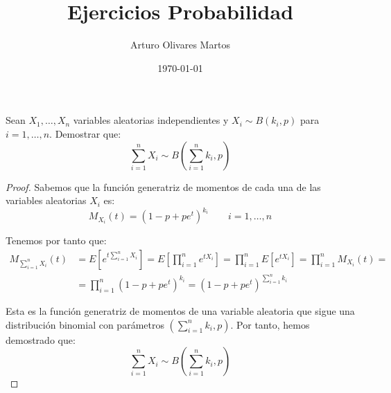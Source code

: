 \documentclass[12pt]{article}
\title{Ejercicios Probabilidad}
\date{\today}
\author{Arturo Olivares Martos}
\begin{document}
    \maketitle

    \begin{ejercicio}
        Sean $X_1, \dots, X_n$ variables aleatorias independientes y $X_i\sim B(k_i, p)$ para $i=1,\dots,n$. Demostrar que:
        \begin{equation*}
            \sum_{i=1}^{n}X_i \sim B\left(\sum_{i=1}^{n}k_i, p\right)
        \end{equation*}
    
        \begin{proof}
            Sabemos que la función generatriz de momentos de cada una de las variables aleatorias $X_i$ es:
            \begin{equation*}
                M_{X_i}(t) = (1-p+pe^t)^{k_i} \qquad i=1,\dots,n
            \end{equation*}
    
            Tenemos por tanto que:
            \begin{align*}
                M_{\sum\limits_{i=1}^{n}X_i}(t) &= E\left[e^{t\sum\limits_{i=1}^{n}X_i}\right] = E\left[\prod_{i=1}^{n}e^{tX_i}\right] = \prod_{i=1}^{n}E[e^{tX_i}] = \prod_{i=1}^{n}M_{X_i}(t) =\\
                &= \prod_{i=1}^{n}(1-p+pe^t)^{k_i} = (1-p+pe^t)^{\sum\limits_{i=1}^{n}k_i}
            \end{align*}
    
            Esta es la función generatriz de momentos de una variable aleatoria que sigue una distribución binomial con parámetros $\left(\sum\limits_{i=1}^{n}k_i, p\right)$. Por tanto, hemos demostrado que:
            \begin{equation*}
                \sum_{i=1}^{n}X_i \sim B\left(\sum_{i=1}^{n}k_i, p\right)
            \end{equation*}
        \end{proof}
    \end{ejercicio}
    
    
    
\end{document}
